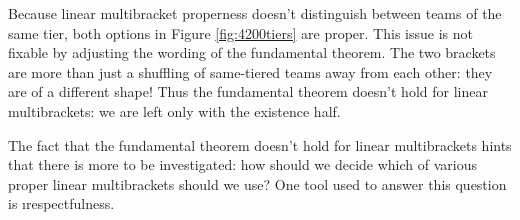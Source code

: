 {

Because linear multibracket properness doesn't distinguish between teams of the same tier, both options in Figure \ref{fig:4200tiers} are proper. This issue is not fixable by adjusting the wording of the fundamental theorem. The two brackets are more than just a shuffling of same-tiered teams away from each other: they are of a different shape! Thus the fundamental theorem doesn't hold for linear multibrackets: we are left only with the existence half.


    The fact that the fundamental theorem doesn't hold for linear multibrackets hints that there is more to be investigated: how should we decide which of various proper linear multibrackets should we use? One tool used to answer this question is \i{respectfulness}.
}